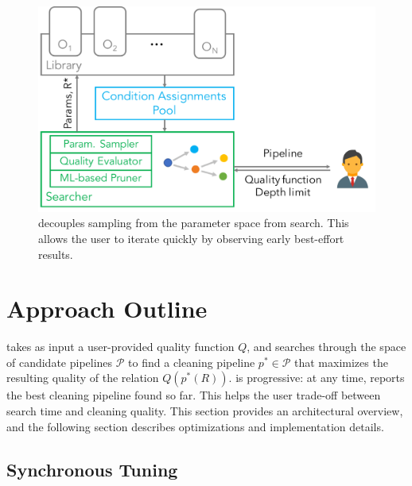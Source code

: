 \begin{figure}[t]
\centering
 \includegraphics[width=0.7\columnwidth]{figures/arch}
 \caption{\small \sys decouples sampling from the parameter space from search. This allows the user to iterate quickly by observing early best-effort results. \label{fig:arch}}
\end{figure}



\section{Approach Outline}

\sys takes as input a user-provided quality function $Q$, and searches through the space of candidate pipelines $\mathcal{P}$ to find a cleaning pipeline $p^*\in\mathcal{P}$ that maximizes the resulting quality of the relation $Q(p^*(R))$.  \sys is progressive: at any time, \sys reports the best cleaning pipeline found so far.  This helps the user trade-off between search time and cleaning quality.  This section provides an architectural overview, and the following section describes optimizations and implementation details.





\subsection{Synchronous Tuning}

